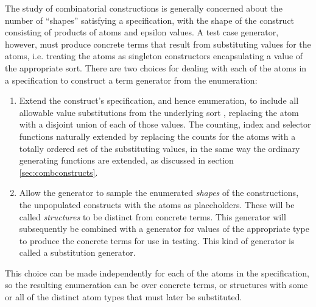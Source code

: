 
The study of combinatorial constructions is generally concerned
about the number of ``shapes'' satisfying a specification,
with the shape of the construct consisting of products of atoms and epsilon values.
A test case generator, however,
must produce concrete terms that result from substituting values for the atoms,
i.e. treating the atoms as singleton constructors encapsulating a value of the appropriate sort.
There are two choices for dealing with each of the atoms in a specification 
to construct a term generator from the enumeration:

\begin{enumerate}
\item Extend the construct's specification, and hence enumeration, 
to include all allowable value substitutions from the underlying sort ,
replacing the atom with a disjoint union of each of those values.
The counting, index and selector functions naturally extended
by replacing the counts for the atoms with a totally ordered set of the substituting values,
in the same way the ordinary generating functions are extended,
as discussed in section \ref{sec:combconstructs}.
\item Allow the generator to sample the enumerated \emph{shapes} of the constructions,
the unpopulated constructs with the atoms as placeholders.
These will be called \emph{structures} to be distinct from concrete terms.
This generator will subsequently be combined with a generator for values of the appropriate type
to produce the concrete terms for use in testing.
This kind of generator is called a substitution generator.
\end{enumerate}

\noindent
This choice can be made independently for each of the atoms in the specification,
so the resulting enumeration can be over concrete terms,
or structures with some or all of the distinct atom types 
that must later be substituted.


